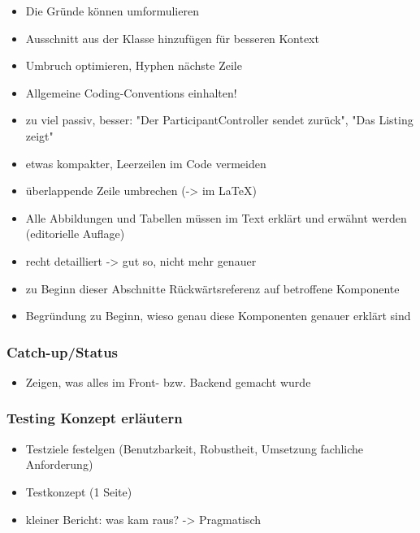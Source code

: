 \begin{itemize}

\item
  \grqq Die Gründe können\grqq{} umformulieren
\item
  \grqq Ausschnitt aus der Klasse\grqq{} hinzufügen für besseren Kontext
\item
  Umbruch optimieren, Hyphen nächste Zeile
\item
  Allgemeine Coding-Conventions einhalten!
\item
  zu viel passiv, besser: "Der ParticipantController sendet zurück",
  "Das Listing zeigt"
\item
  etwas kompakter, Leerzeilen im Code vermeiden
\item
  überlappende Zeile umbrechen (-\textgreater{} im LaTeX)
\item
  Alle Abbildungen und Tabellen müssen im Text erklärt und erwähnt
  werden (editorielle Auflage)
\item
  recht detailliert -\textgreater{} gut so, nicht mehr genauer
\item
  zu Beginn dieser Abschnitte Rückwärtsreferenz auf betroffene
  Komponente
\item
  Begründung zu Beginn, wieso genau diese Komponenten genauer erklärt
  sind
\end{itemize}

\hypertarget{catch-upux2fstatus}{%
\subsubsection*{Catch-up/Status}\label{catch-upux2fstatus}}

\begin{itemize}

\item
  Zeigen, was alles im Front- bzw. Backend gemacht wurde
\end{itemize}

\hypertarget{testing-konzept-erlautern}{%
\subsubsection*{Testing Konzept
erläutern}\label{testing-konzept-erlautern}}

\begin{itemize}

\item
  Testziele festelgen (Benutzbarkeit, Robustheit, Umsetzung fachliche
  Anforderung)
\item
  Testkonzept (1 Seite)
\item
  kleiner Bericht: was kam raus? -\textgreater{} Pragmatisch
\end{itemize}


